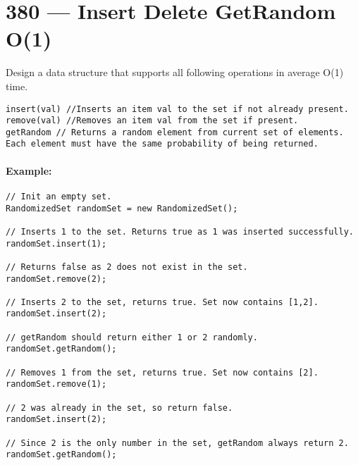 \section{380 --- Insert Delete GetRandom O(1)}
Design a data structure that supports all following operations in average O(1) time.

\begin{lstlisting}[style=customc]
insert(val) //Inserts an item val to the set if not already present.
remove(val) //Removes an item val from the set if present.
getRandom // Returns a random element from current set of elements. Each element must have the same probability of being returned.
\end{lstlisting}

\paragraph{Example:}

\begin{lstlisting}[style=customc]
// Init an empty set.
RandomizedSet randomSet = new RandomizedSet();

// Inserts 1 to the set. Returns true as 1 was inserted successfully.
randomSet.insert(1);

// Returns false as 2 does not exist in the set.
randomSet.remove(2);

// Inserts 2 to the set, returns true. Set now contains [1,2].
randomSet.insert(2);

// getRandom should return either 1 or 2 randomly.
randomSet.getRandom();

// Removes 1 from the set, returns true. Set now contains [2].
randomSet.remove(1);

// 2 was already in the set, so return false.
randomSet.insert(2);

// Since 2 is the only number in the set, getRandom always return 2.
randomSet.getRandom();
\end{lstlisting}

